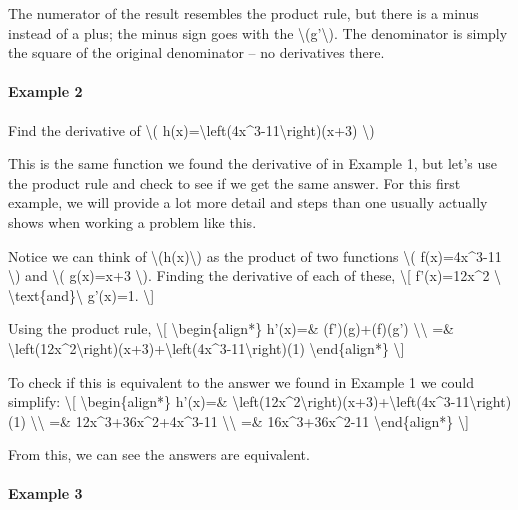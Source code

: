 The numerator of the result resembles the product rule, but there is a
minus instead of a plus; the minus sign goes with the
\textbackslash{}(g'\textbackslash{}). The denominator is simply the
square of the original denominator -- no derivatives there.

\hypertarget{example-2}{%
\paragraph{Example 2}\label{example-2}}

Find the derivative of \textbackslash{}(
h(x)=\textbackslash{}left(4x\^{}3-11\textbackslash{}right)(x+3)
\textbackslash{})

This is the same function we found the derivative of in Example 1, but
let's use the product rule and check to see if we get the same answer.
For this first example, we will provide a lot more detail and steps than
one usually actually shows when working a problem like this.

Notice we can think of \textbackslash{}(h(x)\textbackslash{}) as the
product of two functions \textbackslash{}( f(x)=4x\^{}3-11
\textbackslash{}) and \textbackslash{}( g(x)=x+3 \textbackslash{}).
Finding the derivative of each of these, \textbackslash{}{[}
f'(x)=12x\^{}2 \textbackslash{}
\textbackslash{}text\{and\}\textbackslash{} g'(x)=1. \textbackslash{}{]}

Using the product rule, \textbackslash{}{[}
\textbackslash{}begin\{align*\} h'(x)=\& (f')(g)+(f)(g')
\textbackslash{}\textbackslash{} =\&
\textbackslash{}left(12x\^{}2\textbackslash{}right)(x+3)+\textbackslash{}left(4x\^{}3-11\textbackslash{}right)(1)
\textbackslash{}end\{align*\} \textbackslash{}{]}

To check if this is equivalent to the answer we found in Example 1 we
could simplify: \textbackslash{}{[} \textbackslash{}begin\{align*\}
h'(x)=\&
\textbackslash{}left(12x\^{}2\textbackslash{}right)(x+3)+\textbackslash{}left(4x\^{}3-11\textbackslash{}right)(1)
\textbackslash{}\textbackslash{} =\& 12x\^{}3+36x\^{}2+4x\^{}3-11
\textbackslash{}\textbackslash{} =\& 16x\^{}3+36x\^{}2-11
\textbackslash{}end\{align*\} \textbackslash{}{]}

From this, we can see the answers are equivalent.

\hypertarget{example-3}{%
\paragraph{Example 3}\label{example-3}}

